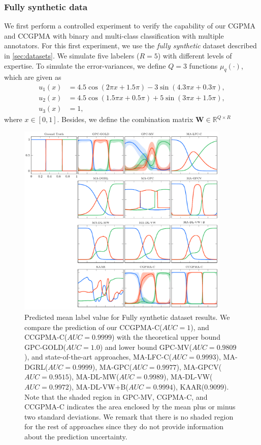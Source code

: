 \documentclass[journal]{IEEEtran}
\providecommand{\mat}[1]{{\bm{#1}}} %
\newcommand{\Real}{\mathbb{R}}
\providecommand{\mat}[1]{{\mathbf{#1}}}
\begin{document}
\subsubsection{Fully synthetic data} We first perform a controlled experiment to verify the capability of our CGPMA and CCGPMA with binary and multi-class classification with multiple annotators. For this first experiment, we use the \textit{fully synthetic} dataset described in \cref{sec:datasets}. We simulate five labelers ($R=5$) with different levels of expertise. To simulate the error-variances, we define $Q=3$ functions $\mu_q(\cdot)$, which are given as 
\begin{align}
\label{eq:u1c}
u_1(x) &= 4.5\cos(2\pi x + 1.5\pi) - 3\sin(4.3\pi x + 0.3\pi),\\
\label{eq:u2c}
u_2(x) &= 4.5\cos(1.5\pi x + 0.5\pi) + 5\sin(3\pi x + 1.5\pi),\\
\label{eq:u3c}
u_3(x) &= 1,
\end{align}
where $x\in [0,1]$. Besides, we define the combination matrix $\mat{W} \in \Real^{Q\times R}$
\begin{figure}[!tb]
	\centering
% 	
	\includegraphics[width = 0.90\textwidth]{Figures/SinCla.pdf}
	\caption{Predicted mean label value for Fully synthetic dataset results. We compare the prediction of our CCGPMA-C($AUC=1$), and CCGPMA-C($AUC=0.9999$) with the theoretical upper bound GPC-GOLD($AUC=1.0$) and lower bound GPC-MV($AUC=0.9809$), and state-of-the-art approaches, MA-LFC-C($AUC=0.9993$), MA-DGRL($AUC=0.9999$),  MA-GPC($AUC=0.9977$), MA-GPCV($AUC=0.9515$), MA-DL-MW($AUC=0.9989$), MA-DL-VW($AUC=0.9972$), MA-DL-VW+B($AUC=0.9994$), KAAR($0.9099$). Note that the shaded region in GPC-MV, CGPMA-C, and CCGPMA-C indicates the area enclosed by the mean plus or minus two standard deviations. We remark that there is no shaded region for the rest of approaches since they do not provide information about the prediction uncertainty.}
	\label{fig:FSCla}
\end{figure}
\end{document}
